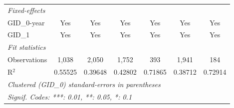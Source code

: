 \begin{table}[htbp]
\begin{tabular}{lcccccc}
      \midrule
      \emph{Fixed-effects}\\
      GID\_0-year        & Yes                     & Yes                     & Yes                     & Yes                            & Yes                           & Yes\\  
      GID\_1             & Yes                     & Yes                     & Yes                     & Yes                            & Yes                           & Yes\\  
      \midrule
      \emph{Fit statistics}\\
      Observations       & 1,038                   & 2,050                   & 1,752                   & 393                            & 1,941                         & 184\\  
      R$^2$              & 0.55525                 & 0.39648                 & 0.42802                 & 0.71865                        & 0.38712                       & 0.72914\\  
      \midrule \midrule
      \multicolumn{7}{l}{\emph{Clustered (GID\_0) standard-errors in parentheses}}\\
      \multicolumn{7}{l}{\emph{Signif. Codes: ***: 0.01, **: 0.05, *: 0.1}}\\
   \end{tabular}
\end{table}



